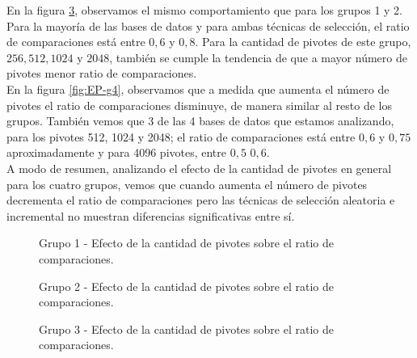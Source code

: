 En la figura \ref{fig:EP-g3}, observamos el mismo comportamiento que para los grupos 1 y 2. Para la mayor\'ia de las bases de datos y para ambas t\'ecnicas de selecci\'on, el ratio de comparaciones est\'a entre $0,6$ y $0,8$. Para la cantidad de pivotes de este grupo, $256, 512, 1024$ y $2048$, tambi\'en se cumple la tendencia de que a mayor n\'umero de pivotes menor ratio de comparaciones.\\

En la figura \ref{fig:EP-g4}, observamos que a medida que aumenta el n\'umero de pivotes el ratio de comparaciones disminuye, de manera similar al resto de los grupos. Tambi\'en vemos que 3 de las 4 bases de datos que estamos analizando, para los pivotes 512, 1024 y 2048; el ratio de comparaciones est\'a entre $0,6$ y $0,75$ aproximadamente y para 4096 pivotes, entre $0,5$ $0,6$.\\

A modo de resumen, analizando el efecto de la cantidad de pivotes en general para los cuatro grupos, vemos que cuando aumenta el n\'umero de pivotes decrementa el ratio de comparaciones pero las t\'ecnicas de selecci\'on aleatoria e incremental no muestran diferencias significativas entre s\'i.

\begin{figure}[tb]
\centering
{}
		\caption{\small Grupo 1 - Efecto de la cantidad de pivotes sobre el ratio de comparaciones.}
		\label{fig:EP-g1}
\end{figure}

\begin{figure}[H]
\centering
{}
		\caption{\small Grupo 2 - Efecto de la cantidad de pivotes sobre el ratio de comparaciones.}
		\label{fig:EP-g2}
\end{figure}

\begin{figure}[tb]
\centering
{}
		\caption{\small Grupo 3 - Efecto de la cantidad de pivotes sobre el ratio de comparaciones.}
		\label{fig:EP-g3}
\end{figure}

